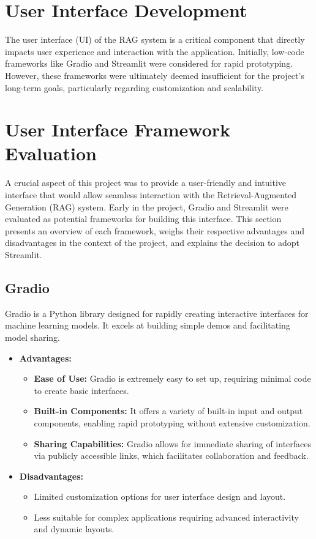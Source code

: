 \documentclass[12pt]{report}
\begin{document}
\section{User Interface Development}
The user interface (UI) of the RAG system is a critical component that directly impacts user experience and interaction with the application. Initially, low-code frameworks like Gradio and Streamlit were considered for rapid prototyping. However, these frameworks were ultimately deemed insufficient for the project's long-term goals, particularly regarding customization and scalability.

\section{User Interface Framework Evaluation}
A crucial aspect of this project was to provide a user-friendly and intuitive interface that would allow seamless interaction with the Retrieval-Augmented Generation (RAG) system. Early in the project, Gradio and Streamlit were evaluated as potential frameworks for building this interface. This section presents an overview of each framework, weighs their respective advantages and disadvantages in the context of the project, and explains the decision to adopt Streamlit.

\subsection{Gradio}
Gradio is a Python library designed for rapidly creating interactive interfaces for machine learning models. It excels at building simple demos and facilitating model sharing.

\setlength{\itemsep}{1pt}
\setlength{\parskip}{0pt}

\begin{itemize}
    \item \textbf{Advantages:}
    \begin{itemize}
        \item \textbf{Ease of Use:} Gradio is extremely easy to set up, requiring minimal code to create basic interfaces.
        \item \textbf{Built-in Components:} It offers a variety of built-in input and output components, enabling rapid prototyping without extensive customization.
        \item \textbf{Sharing Capabilities:} Gradio allows for immediate sharing of interfaces via publicly accessible links, which facilitates collaboration and feedback.
    \end{itemize}
    \item \textbf{Disadvantages:}
    \begin{itemize}
        \item Limited customization options for user interface design and layout.
        \item Less suitable for complex applications requiring advanced interactivity and dynamic layouts.
    \end{itemize}
\end{itemize}
\end{document}
